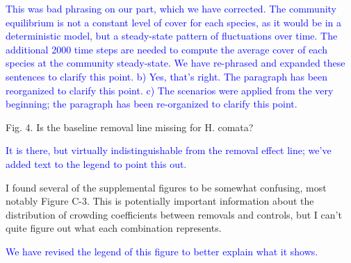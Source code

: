 \documentclass[12pt]{article}
\newcommand{\response}{\textcolor{blue}}
\begin{document}
\response{This was bad phrasing on our part, which we have corrected. 
The community equilibrium is not a constant level of cover for each species, as it would be in a deterministic
model, but a steady-state pattern of fluctuations over time. The additional 2000 time steps are needed to compute the average cover of each species
at the community steady-state. We have re-phrased and expanded these sentences to clarify this point. b) Yes, that's right. The paragraph
has been reorganized to clarify this point. c) The scenarios were applied from the very beginning; the paragraph has been re-organized to 
clarify this point.}

Fig. 4. Is the baseline removal line missing for H. comata?

\response{It is there, but virtually indistinguishable from the removal effect line; we've added text to the legend to point this out.}

I found several of the supplemental figures to be somewhat confusing, most notably Figure C-3. This is
potentially important information about the distribution of crowding coefficients between removals and
controls, but I can’t quite figure out what each combination represents.

\response{We have revised the legend of this figure to better explain what it shows.}
\end{document}
